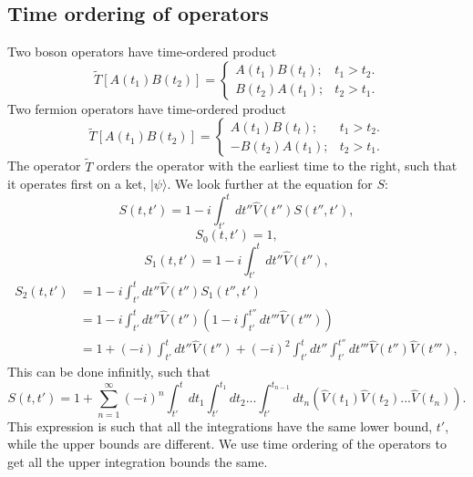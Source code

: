 \subsection*{Time ordering of operators}
\newline
Two boson operators have time-ordered product 
\[\tilde{T}[A(t_{1})B(t_{2})]= \begin{cases}A(t_{1})B(t_{t}); & t_{1}>t_{2}.\\
B(t_{2})A(t_{1}); & t_{2}>t_{1}.
\end{cases} \]
\newline
{}\newline
Two fermion operators have time-ordered product
\[\tilde{T}[A(t_{1})B(t_{2})]= \begin{cases}A(t_{1})B(t_{t}); & t_{1}>t_{2}.\\
-B(t_{2})A(t_{1}); & t_{2}>t_{1}.
\end{cases} \] \newline
The operator $\tilde{T}$ orders the operator with the earliest time to the right, such that it operates first on a ket, $|\psi\rangle$.\newline
\newline
We look further at the equation for $S$:
\[S(t,t')=1-i\int_{t'}^{t}dt''\hat{V}(t'')S(t'',t'),\]
\newline
\[S_{0}(t,t')=1,\]
\newline
\[S_{1}(t,t')=1-i\int_{t'}^{t}dt''\hat{V}(t''),\]
\newline
\begin{align}
	S_{2}(t,t')&=1-i\int_{t'}^{t}dt''\hat{V}(t'')S_{1}(t'',t')\nonumber \\
	&=1-i\int_{t'}^{t}dt''\hat{V}(t'')\left(1-i\int_{t'}^{t''}dt'''\hat{V}(t''')\right) \nonumber \\ 
	&=1+(-i)\int_{t'}^{t}dt''\hat{V}(t'')+(-i)^{2}\int_{t'}^{t}dt''\int_{t'}^{t''}dt'''\hat{V}(t'')\hat{V}(t'''),\nonumber
\end{align}
This can be done infinitly, such that
\[S(t,t')=1+\sum_{n=1}^{\infty}(-i)^{n}\int_{t'}^{t}dt_{1}\int_{t'}^{t_{1}}dt_{2}...\int_{t'}^{t_{n-1}}dt_{n}\left(\hat{V}(t_{1})\hat{V}(t_{2})...\hat{V}(t_{n})\right).\]
This expression is such that all the integrations have the same lower bound, $t'$, while the upper bounds are different. We use time ordering of the operators to get all the upper integration bounds the same.\newline
\newline
